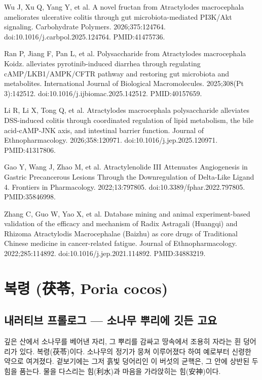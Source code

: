 \documentclass[12pt,oneside]{book}
\newcommand{\refend}{\endgroup\par}
\newcommand{\reff}[2]{\par\hangindent=7mm\hangafter=1\noindent[#1]\hspace{2mm}#2\par}
\begin{document}
\reff{47}{Wu J, Xu Q, Yang Y, et al. A novel fructan from Atractylodes macrocephala ameliorates ulcerative colitis through gut microbiota-mediated PI3K/Akt signaling. Carbohydrate Polymers. 2026;375:124764. doi:10.1016/j.carbpol.2025.124764. PMID:41475736.}

\reff{48}{Ran P, Jiang F, Pan L, et al. Polysaccharide from Atractylodes macrocephala Koidz. alleviates pyrotinib-induced diarrhea through regulating cAMP/LKB1/AMPK/CFTR pathway and restoring gut microbiota and metabolites. International Journal of Biological Macromolecules. 2025;308(Pt 3):142512. doi:10.1016/j.ijbiomac.2025.142512. PMID:40157659.}

\reff{49}{Li R, Li X, Tong Q, et al. Atractylodes macrocephala polysaccharide alleviates DSS-induced colitis through coordinated regulation of lipid metabolism, the bile acid-cAMP-JNK axis, and intestinal barrier function. Journal of Ethnopharmacology. 2026;358:120971. doi:10.1016/j.jep.2025.120971. PMID:41317806.}

\reff{50}{Gao Y, Wang J, Zhao M, et al. Atractylenolide III Attenuates Angiogenesis in Gastric Precancerous Lesions Through the Downregulation of Delta-Like Ligand 4. Frontiers in Pharmacology. 2022;13:797805. doi:10.3389/fphar.2022.797805. PMID:35846998.}

\reff{51}{Zhang C, Guo W, Yao X, et al. Database mining and animal experiment-based validation of the efficacy and mechanism of Radix Astragali (Huangqi) and Rhizoma Atractylodis Macrocephalae (Baizhu) as core drugs of Traditional Chinese medicine in cancer-related fatigue. Journal of Ethnopharmacology. 2022;285:114892. doi:10.1016/j.jep.2021.114892. PMID:34883219.}

\refend


\chapter{복령 (茯苓, Poria cocos)}

\section{내러티브 프롤로그 — 소나무 뿌리에 깃든 고요}

깊은 산에서 소나무를 베어낸 자리, 그 뿌리를 감싸고 땅속에서 조용히 자라는 흰 덩어리가 있다. 복령(茯苓)이다. 소나무의 정기가 뭉쳐 이루어졌다 하여 예로부터 신령한 약으로 여겨졌다. 겉보기에는 그저 흙빛 덩어리인 이 버섯의 균핵은, 그 안에 상반된 두 힘을 품는다. 물을 다스리는 힘(利水)과 마음을 가라앉히는 힘(安神)이다.
\end{document}
